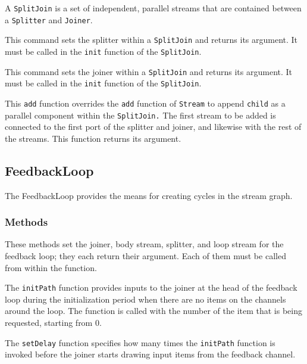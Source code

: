 A {\tt SplitJoin} is a set of independent, parallel streams that are
contained between a {\tt Splitter} and {\tt Joiner}.

  This command sets the splitter within a {\tt SplitJoin} and returns its argument.  It must be called in the {\tt init} function of the {\tt SplitJoin}.

 This command sets the joiner within a {\tt SplitJoin} and returns its argument.  It must be called in the {\tt init} function of the {\tt SplitJoin}.

 This {\tt add} function overrides the {\tt add} function of {\tt Stream} to append {\tt child} as a parallel component within the {\tt SplitJoin.}  The first stream to be added is connected to the first port of the splitter and joiner, and likewise with the rest of the streams.  This function returns its argument.

\subsection{FeedbackLoop}

The FeedbackLoop provides the means for creating cycles in the stream
graph.

\subsubsection{Methods}


These methods set the joiner, body stream, splitter, and loop stream for the feedback loop; they each return their argument.  Each of them must be called from within the {\init} function.

  The {\tt initPath} function provides inputs to the joiner at the head of the feedback loop during the initialization period when there are no items on the channels around the loop.  The function is called with the number of the item that is being requested, starting from 0.

  The {\tt setDelay} function specifies how many times the {\tt initPath} function is invoked before the joiner starts drawing input items from the feedback channel.

